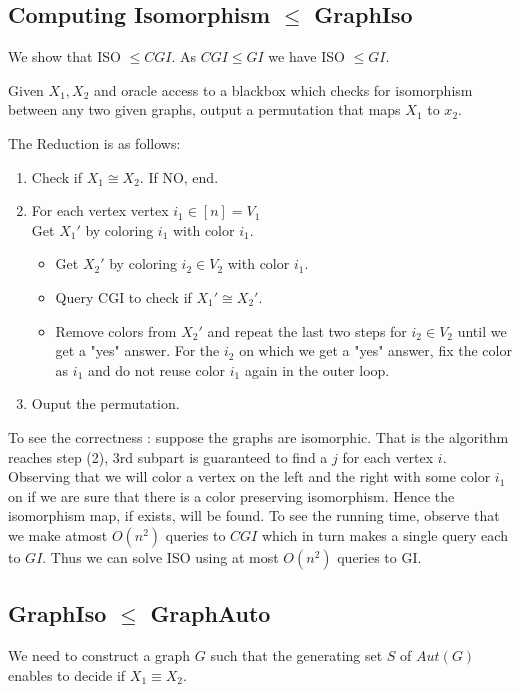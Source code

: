 \subsection{Computing Isomorphism $\le$ {\sc GraphIso}}

We show that {\sc ISO} $\le CGI$. As $CGI \leq GI$ we have {\sc ISO} $\le GI$. 

Given $X_1,X_2$ and oracle access to a blackbox which checks for isomorphism between any two given graphs, output a permutation that maps $X_1$ to $x_2$.

The Reduction is as follows:
\begin{enumerate}
\item Check if $X_1 \cong X_2$. If NO, end.
\item For each vertex vertex $i_1 \in [n] = V_1$ \\
	Get $X_1'$ by coloring $i_1$ with color $i_1$.
	\begin{itemize}
	\item Get $X_2'$ by coloring $i_2 \in V_2$ with color $i_1$.
	\item Query CGI to check if $X_1' \cong X_2'$.
	\item Remove colors from $X_2'$ and repeat the last two steps for $i_2 \in V_2$ until we get a "yes" answer. For the $i_2$ on which we get a "yes" answer, fix the color as $i_1$ and do not reuse color $i_1$ again in the outer loop.
	\end{itemize}
\item Ouput the permutation.
\end{enumerate}

To see the correctness : suppose the graphs are isomorphic. That is the algorithm reaches step (2), 3rd subpart is guaranteed to find a $j$ for each vertex $i$. Observing that we will color a vertex on the left and the right with some color $i_1$ on if we are sure that there is a color preserving isomorphism. Hence the isomorphism map, if exists, will be found.
To see the running time, observe that we make atmost $O(n^2)$ queries to $CGI$ which in turn makes a single query each to $GI$. Thus we can solve {\sc ISO} using at most $O(n^2)$ queries to {\sc GI}.


\subsection{{\sc GraphIso} $\le$ {\sc GraphAuto}}

We need to construct a graph $G$ such that the generating set $S$ of $Aut(G)$ enables to decide if $X_1\equiv X_2$. 

